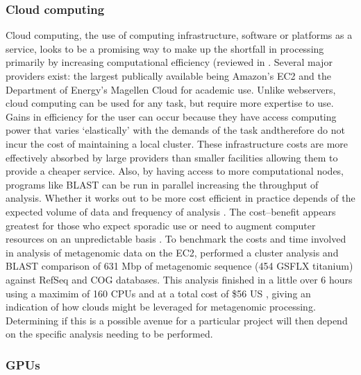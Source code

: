 \subsubsection{Cloud computing}
Cloud computing, the use of computing infrastructure, software or platforms as a service, looks to be a promising way to make up the shortfall in processing primarily by increasing computational efficiency (reviewed in \citet{Thakur2012}.
Several major providers exist: the largest publically available being Amazon's \ac{EC2} and the Department of Energy's Magellen Cloud for academic use.
Unlike webservers, cloud computing can be used for any task, but require more expertise to use.
Gains in efficiency for the user can occur because they have access computing power that varies `elastically' with the demands of the task andtherefore do not incur the cost of maintaining a local cluster.
These infrastructure costs are more effectively absorbed by large providers than smaller facilities allowing them to provide a cheaper service.
Also, by having access to more computational nodes, programs like \acs{BLAST} can be run in parallel increasing the throughput of analysis.
Whether it works out to be more cost efficient in practice depends of the expected volume of data and frequency of analysis \cite{Wilkening2009}.
The cost--benefit appears greatest for those who expect sporadic use or need to augment computer resources on an unpredictable basis \cite{Wilkening2009}.
To benchmark the costs and time involved in analysis of metagenomic data on the \ac{EC2}, \citet{Anguioli2011} performed a cluster analysis and \acs{BLAST} comparison of 631 Mbp of metagenomic sequence (454 GSFLX titanium) against RefSeq and \acs{COG} databases.
This analysis finished in a little over 6 hours using a maximim of 160 CPUs and at a total cost of \$56 US \cite{Anguioli2011}, giving an indication of how clouds might be leveraged for metagenomic processing.
Determining if this is a possible avenue for a particular project will then depend on the specific analysis needing to be performed.


\subsubsection{GPUs}

